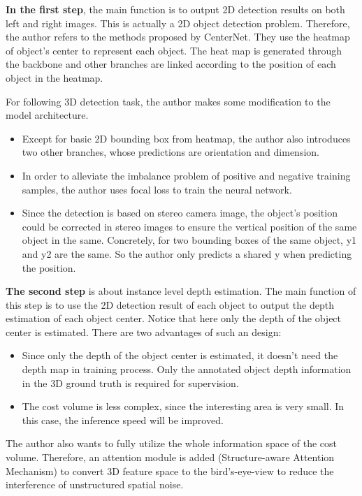 \documentclass[12pt]{article}
\begin{document}
\textbf{In the first step}, the main function is to output 2D detection results on both left and right images. This is actually a 2D object detection problem. Therefore, the author refers to the methods proposed by CenterNet\cite{centernet}. They use the heatmap of object's center to represent each object. The heat map is generated through the backbone and other branches are linked according to the position of each object in the heatmap. 

For following 3D detection task, the author makes some modification to the model architecture.
\begin{itemize}
    \item Except for basic 2D bounding box from heatmap, the author also introduces two other branches, whose predictions are orientation and dimension.
    \item In order to alleviate the imbalance problem of positive and negative training samples, the author uses focal loss to train the neural network.
    \item Since the detection is based on stereo camera image, the object's position could be corrected in stereo images to ensure the vertical position of the same object in the same. Concretely, for two bounding boxes of the same object, y1 and y2 are the same. So the author only predicts a shared y when predicting the position.
\end{itemize}

\textbf{The second step} is about instance level depth estimation. The main function of this step is to use the 2D detection result of each object to output the depth estimation of each object center. Notice that here only the depth of the object center is estimated. There are two advantages of such an design:
\begin{itemize}
    \item Since only the depth of the object center is estimated, it doesn't need the depth map in training process. Only the annotated object depth information in the 3D ground truth is required for supervision.
    \item The cost volume is less complex, since the interesting area is very small. In this case, the inference speed will be improved.
\end{itemize}
The author also wants to fully utilize the whole information space of the cost volume. Therefore, an attention module is added (Structure-aware Attention Mechanism) to convert 3D feature space to the bird's-eye-view to reduce the interference of unstructured spatial noise.
\end{document}
